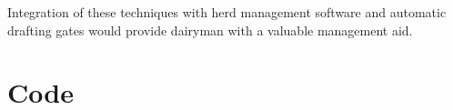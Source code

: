 \documentclass[11pt]{article}
\begin{document}
	Integration of these techniques with herd management software and automatic drafting gates would provide dairyman with a valuable management aid.

	\newpage

\section{Code}
	

\newpage


\end{document}
